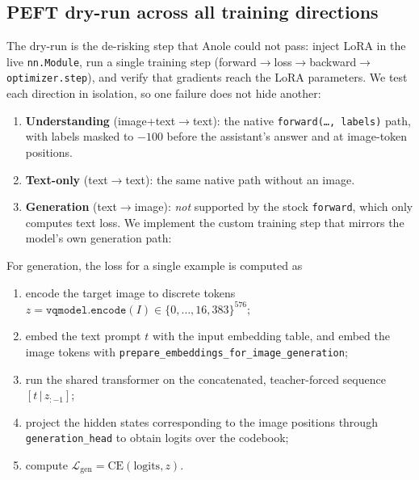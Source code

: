 \subsection{PEFT dry-run across all training directions}
\label{sec:dryrun}

The dry-run is the de-risking step that Anole could not pass: inject LoRA in
the live \texttt{nn.Module}, run a single training step
(forward$\rightarrow$loss$\rightarrow$backward$\rightarrow$\texttt{optimizer.step}),
and verify that gradients reach the LoRA parameters. We test each direction
in isolation, so one failure does not hide another:

\begin{enumerate}
    \item \textbf{Understanding} (image+text$\rightarrow$text): the native
          \texttt{forward(\dots, labels)} path, with labels masked to
          $-100$ before the assistant's answer and at image-token positions.
    \item \textbf{Text-only} (text$\rightarrow$text): the same native path
          without an image.
    \item \textbf{Generation} (text$\rightarrow$image): \emph{not} supported
          by the stock \texttt{forward}, which only computes text loss. We
          implement the custom training step that mirrors the model's own
          generation path:
\end{enumerate}

\noindent For generation, the loss for a single example is computed as

\begin{enumerate}
    \item encode the target image to discrete tokens
          $z = \texttt{vqmodel.encode}(I)\in\{0,\dots,16{,}383\}^{576}$;
    \item embed the text prompt $t$ with the input embedding table, and embed
          the image tokens with
          \texttt{prepare\_embeddings\_for\_image\_generation};
    \item run the shared transformer on the concatenated, teacher-forced
          sequence $[t \,|\, z_{:-1}]$;
    \item project the hidden states corresponding to the image positions
          through \texttt{generation\_head} to obtain logits over the codebook;
    \item compute $\mathcal{L}_{\text{gen}} = \mathrm{CE}(\text{logits}, z)$.
\end{enumerate}

